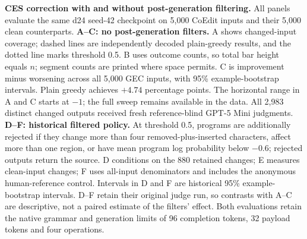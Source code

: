 \textbf{CES correction with and without post-generation filtering.}
All panels evaluate the same d24 seed-42 checkpoint on 5,000 CoEdit inputs and their 5,000 clean counterparts.
\textbf{A--C: no post-generation filters.} A shows changed-input coverage; dashed lines are independently decoded plain-greedy results, and the dotted line marks threshold 0.5. B uses outcome counts, so total bar height equals $n$; segment counts are printed where space permits. C is improvement minus worsening across all 5,000 GEC inputs, with 95\% example-bootstrap intervals. Plain greedy achieves $+4.74$ percentage points. The horizontal range in A and C starts at $-1$; the full sweep remains available in the data. All 2,983 distinct changed outputs received fresh reference-blind GPT-5 Mini judgments.
\textbf{D--F: historical filtered policy.} At threshold 0.5, programs are additionally rejected if they change more than four removed-plus-inserted characters, affect more than one region, or have mean program log probability below $-0.6$; rejected outputs return the source. D conditions on the 880 retained changes; E measures clean-input changes; F uses all-input denominators and includes the anonymous human-reference control. Intervals in D and F are historical 95\% example-bootstrap intervals. D--F retain their original judge run, so contrasts with A--C are descriptive, not a paired estimate of the filters' effect. Both evaluations retain the native grammar and generation limits of 96 completion tokens, 32 payload tokens and four operations.
